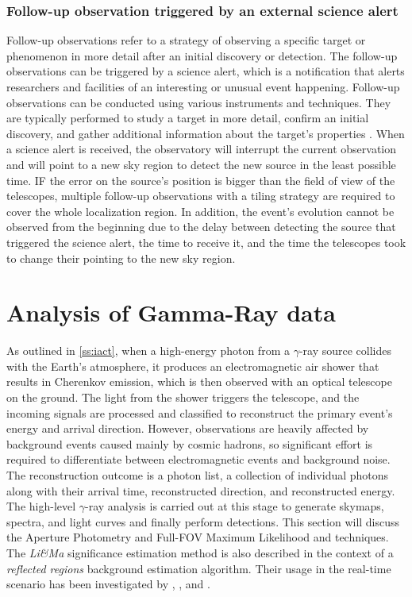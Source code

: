 \subsubsection{Follow-up observation triggered by an external science alert}
\label{s:follow-up-observation}
Follow-up observations refer to a strategy of observing a specific target or phenomenon in more detail after an initial discovery or detection. The follow-up observations can be triggered by a science alert, which is a notification that alerts researchers and facilities of an interesting or unusual event happening. Follow-up observations can be conducted using various instruments and techniques. They are typically performed to study a target in more detail, confirm an initial discovery, and gather additional information about the target's properties \cite{ScienceWithCherenkovTelescopeArray2018}. When a science alert is received, the observatory will interrupt the current observation and will point to a new sky region to detect the new source in the least possible time. IF the error on the source's position is bigger than the field of view of the telescopes,  multiple follow-up observations with a tiling strategy \cite{bulgarelli2015on} are required to cover the whole localization region. In addition, the event's evolution cannot be observed from the beginning due to the delay between detecting the source that triggered the science alert, the time to receive it, and the time the telescopes took to change their pointing to the new sky region. 



\section{Analysis of Gamma-Ray data}
\label{s:gamma-ray-data-analysis}
As outlined in \autoref{ss:iact}, when a high-energy photon from a $\gamma$-ray source collides with the Earth's atmosphere, it produces an electromagnetic air shower that results in Cherenkov emission, which is then observed with an optical telescope on the ground. The light from the shower triggers the telescope, and the incoming signals are processed and classified to reconstruct the primary event's energy and arrival direction. However, observations are heavily affected by background events caused mainly by cosmic hadrons, so significant effort is required to differentiate between electromagnetic events and background noise. The reconstruction outcome is a photon list, a collection of individual photons along with their arrival time, reconstructed direction, and reconstructed energy. The high-level $\gamma$-ray analysis is carried out at this stage to generate skymaps, spectra, and light curves and finally perform detections. This section will discuss the Aperture Photometry and Full-FOV Maximum Likelihood and  techniques. The \textit{Li\&Ma} significance estimation method is also described in the context of a \textit{reflected regions} background estimation algorithm. Their usage in the real-time scenario has been investigated by \cite{tampieri2020real}, \cite{di2020detection}, and \cite{di2021detection}. 

